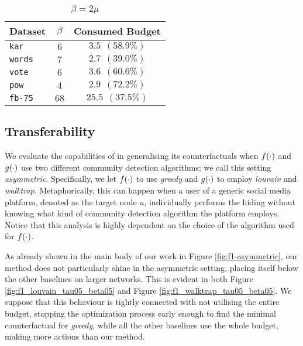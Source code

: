 \begin{table}[htpb]
\begin{subtable}[b]{0.33\linewidth}
        \centering
        \caption{$\beta=2\mu$}
        \label{tab:used_budget_beta2}
        \begin{tabular}{ l c c }
            \toprule
            {\textbf{Dataset}} &  
            {$\beta$} & {Consumed Budget}  \\
            \midrule
            \rowcolor[gray]{0.95} \texttt{kar} & $6$ & $3.5 \ \ (58.9\%)$ \\
            \texttt{words} & $7$ & $2.7 \ \ (39.0\%)$ \\
            \rowcolor[gray]{0.95} \texttt{vote} & $6$ & $3.6 \ \ (60.6\%)$ \\
            \texttt{pow} & $4$ & $2.9 \ \ (72.2\%)$ \\
            \rowcolor[gray]{0.95}\texttt{fb-75} & $68$ & $25.5 \ \ (37.5\%)$ \\
            \bottomrule
        \end{tabular}
    \end{subtable}
\end{table}


\subsection{Transferability}
\label{app:transferability}
We evaluate the capabilities of \method{} in generalising its counterfactuals when $f(\cdot)$ and $g(\cdot)$ use two different community detection algorithms; we call this setting \emph{asymmetric}. Specifically, we let $f(\cdot)$ to use \textit{greedy} and $g(\cdot)$ to employ \textit{louvain} and \textit{walktrap}. Metaphorically, this can happen when a user of a generic social media platform, denoted as the target node $u$, individually performs the hiding without knowing what kind of community detection algorithm the platform employs. Notice that this analysis is highly dependent on the choice of the algorithm used for $f(\cdot)$.

As already shown in the main body of our work in Figure \ref{fig:f1-asymmetric}, our method does not particularly shine in the asymmetric setting, placing itself below the other baselines on larger networks. This is evident in both Figure \ref{fig:f1_louvain_tau05_beta05} and Figure \ref{fig:f1_walktrap_tau05_beta05}. We suppose that this behaviour is tightly connected with not utilising the entire budget, stopping the optimization process early enough to find the minimal counterfactual for \textit{greedy}, while all the other baselines use the whole budget, making more actions than our method.

